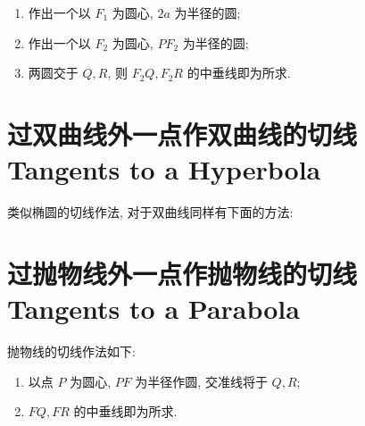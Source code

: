 \begin{enumerate}
  \item 作出一个以 $F_1$ 为圆心, $2a$ 为半径的圆;
  \item 作出一个以 $F_2$ 为圆心, $PF_2$ 为半径的圆;
  \item 两圆交于 $Q,R$, 则 $F_2Q,F_2R$ 的中垂线即为所求.
\end{enumerate}


\section{过双曲线外一点作双曲线的切线 Tangents to a Hyperbola}

类似椭圆的切线作法, 对于双曲线同样有下面的方法:



\section{过抛物线外一点作抛物线的切线 Tangents to a Parabola}

抛物线的切线作法如下:

\begin{enumerate}
  \item 以点 $P$ 为圆心, $PF$ 为半径作圆, 交准线将于 $Q,R$;
  \item $FQ,FR$ 的中垂线即为所求.
\end{enumerate}


